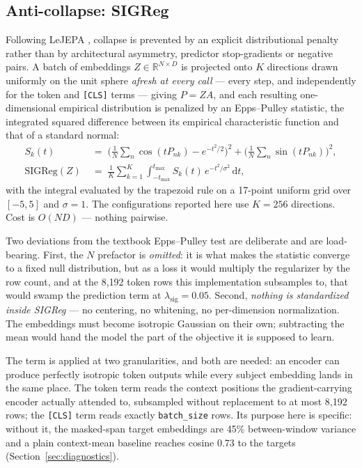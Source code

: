 \documentclass[11pt,a4paper]{article}
\newcommand{\code}[1]{\texttt{\small #1}}
\begin{document}
\subsection{Anti-collapse: SIGReg}

Following LeJEPA \citep{lejepa}, collapse is prevented by an explicit
distributional penalty rather than by architectural asymmetry, predictor
stop-gradients or negative pairs. A batch of embeddings
$Z \in \mathbb{R}^{N \times D}$ is projected onto $K$ directions drawn uniformly
on the unit sphere \emph{afresh at every call} --- every step, and independently
for the token and \code{[CLS]} terms --- giving $P = ZA$, and each resulting
one-dimensional empirical distribution is penalized by an Epps--Pulley
statistic, the integrated squared difference between its empirical
characteristic function and that of a standard normal:
\begin{equation}
\begin{aligned}
S_k(t) &\;=\;
\Big(\tfrac{1}{N}\textstyle\sum_n \cos(t P_{nk}) - e^{-t^2/2}\Big)^2
+ \Big(\tfrac{1}{N}\textstyle\sum_n \sin(t P_{nk})\Big)^2, \\[3pt]
\mathrm{SIGReg}(Z) &\;=\; \frac{1}{K}\sum_{k=1}^{K}
\int_{-t_{\max}}^{t_{\max}} S_k(t)\, e^{-t^2/\sigma^2}\, \mathrm{d}t,
\end{aligned}
\end{equation}
with the integral evaluated by the trapezoid rule on a 17-point uniform grid over
$[-5, 5]$ and $\sigma = 1$. The configurations reported here use $K = 256$
directions. Cost is $O(ND)$ --- nothing pairwise.

Two deviations from the textbook Epps--Pulley test are deliberate and are
load-bearing. First, the $N$ prefactor is \emph{omitted}: it is what makes the
statistic converge to a fixed null distribution, but as a loss it would multiply
the regularizer by the row count, and at the 8{,}192 token rows this
implementation subsamples to, that would swamp the prediction term at
$\lambda_{\mathrm{sig}} = 0.05$. Second, \emph{nothing is standardized inside
SIGReg} --- no centering, no whitening, no per-dimension normalization. The
embeddings must become isotropic Gaussian on their own; subtracting the mean
would hand the model the part of the objective it is supposed to learn.

The term is applied at two granularities, and both are needed: an encoder can
produce perfectly isotropic token outputs while every subject embedding lands in
the same place. The token term reads the context positions the gradient-carrying
encoder actually attended to, subsampled without replacement to at most 8{,}192
rows; the \code{[CLS]} term reads exactly \code{batch\_size} rows. Its purpose
here is specific: without it, the masked-span target embeddings are 45\%
between-window variance and a plain context-mean baseline reaches cosine 0.73 to
the targets (Section~\ref{sec:diagnostics}).
\end{document}
